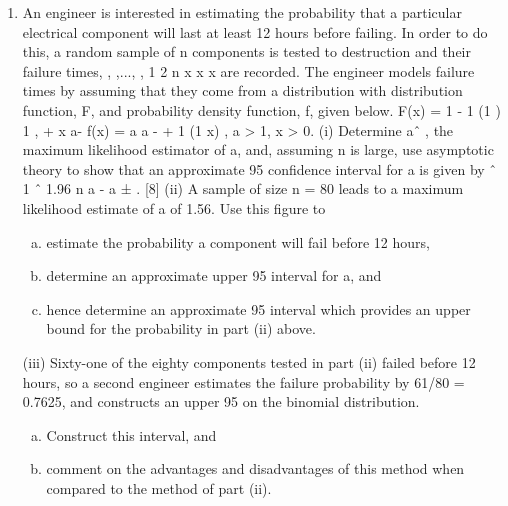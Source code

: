 \documentclass[a4paper,12pt]{article}
\begin{document}
\begin{enumerate}
\newpage
\item  An engineer is interested in estimating the probability that a particular
electrical component will last at least 12 hours before failing. In order to do
this, a random sample of n components is tested to destruction and their
failure times, , ,..., , 1 2 n x x x are recorded. The engineer models failure times by
assuming that they come from a distribution with distribution function, F, and
probability density function, f, given below.
F(x) = 1 - 1
(1 ) 1
,
+ x a- f(x) = a
a
-
+
1
(1 x)
, a > 1, x > 0.
(i) Determine aˆ , the maximum likelihood estimator of a, and, assuming n
is large, use asymptotic theory to show that an approximate 95%
confidence interval for a is given by
ˆ 1 ˆ 1.96
n
a -
a ± . [8]
(ii) A sample of size n = 80 leads to a maximum likelihood estimate of a of
1.56. Use this figure to
\begin{enumerate}[(a)]
\item estimate the probability a component will fail before 12 hours,
\item determine an approximate upper 95%
interval for a, and
\item hence determine an approximate 95%
interval which provides an upper bound for the probability in
part (ii) above. 
\end{enumerate}
(iii) Sixty-one of the eighty components tested in part (ii) failed before 12
hours, so a second engineer estimates the failure probability by
61/80 = 0.7625, and constructs an upper 95%
on the binomial distribution.
\begin{enumerate}[(a)]
\item Construct this interval, and
\item comment on the advantages and disadvantages of this method
when compared to the method of part (ii). 
\end{enumerate}



\end{enumerate}
\end{document}
